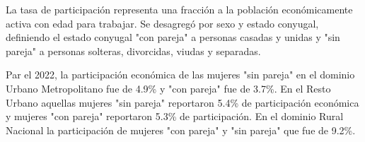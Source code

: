 La tasa de participación representa una fracción a la población económicamente activa con edad para trabajar. Se desagregó por sexo y estado conyugal, definiendo el estado conyugal "con pareja" a personas casadas y unidas y "sin pareja" a personas solteras, divorcidas, viudas y separadas.  

Par el 2022, la participación económica de las mujeres "sin pareja" en el dominio Urbano Metropolitano fue de 4.9\% y "con pareja" fue de 3.7\%. En el Resto Urbano aquellas mujeres "sin pareja" reportaron 5.4\% de participación económica y mujeres "con pareja" reportaron 5.3\% de participación. En el dominio Rural Nacional la participación de mujeres "con pareja" y "sin pareja" que fue de 9.2\%. 
